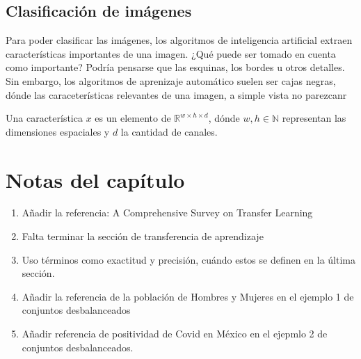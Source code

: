     \subsection{Clasificación de imágenes}
    Para poder clasificar las imágenes, los algoritmos de inteligencia artificial extraen características importantes de una imagen. ¿Qué puede ser tomado en cuenta como importante? Podría pensarse que las esquinas, los bordes u otros detalles. Sin embargo, los algoritmos de aprenizaje automático suelen ser cajas negras, dónde las caraceterísticas relevantes de una imagen, a simple vista no parezcanr
    \begin{definition}[Característica]
        Una característica $x$ es un elemento de $\mathbb R^{w\times h\times d}$, dónde $w,h\in \mathbb N$ representan las dimensiones espaciales y $d$ la cantidad de canales.
    \end{definition}

    \section{Notas del capítulo}
    \begin{enumerate}
        \item  Añadir la referencia: A Comprehensive Survey on Transfer Learning
        \item Falta terminar la sección de transferencia de aprendizaje
        \item Uso términos como exactitud y precisión, cuándo estos se definen en la última sección.
        \item Añadir la referencia de la población de Hombres y Mujeres en el ejemplo 1 de conjuntos desbalanceados
        \item Añadir referencia de positividad de Covid en México en el ejepmlo 2 de conjuntos desbalanceados.
    \end{enumerate}